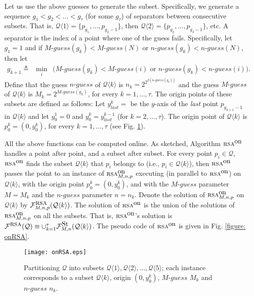 \documentclass[11pt]{article}
\newcommand{\lrangle}[1]{\langle #1\rangle}
\newcommand{\calF}{\mathcal{F}}
\newcommand{\calQ}{\mathcal{Q}}
\newcommand{\onRSAmnp}[0]{\mbox{\sc rsa}^{\mbox{\upshape on}}_{\MM,\nn,p}}
\newcommand{\onRSA}{\mbox{\sc rsa}^{\mbox{\upshape on}}}
\newcommand{\RSAFon}[0]{\calF^{\mbox{\upshape St}}_{\MM,\nn}}
\newcommand{\MM}[0]{M}
\newcommand{\nn}{n}
\newcommand{\nguess}[0]{n\mbox{-}guess}
\newcommand{\Mguess}[0]{M\mbox{-}guess}
\newcommand{\tetration}[1]{2^{2^{2#1}}}
\newcommand{\FRSAmn}[0]{\calF^{\mbox{\sc rsa}}_{\MM,\nn,p}}
\newcommand{\FRSA}[0]{\calF^{\mbox{\sc rsa}}}
\begin{document}
Let us use the above guesses to generate the subset.
Specifically, we generate a sequence $g_1<g_2<...<g_\tau$ (for some $g_\tau$)
of separators between consecutive subsets.
That is, $\calQ\lrangle{1}=\{p_{g_1},...,p_{{g_2}-1}\}$, then $\calQ\lrangle{2}=\{p_{g_2},...,p_{{g_3}-1}\}$, etc.
A separator is the index of a point where one of the guess fails.
Specifically, let $g_1=1$ and if $\Mguess({g_k})<\Mguess(N)$ or $\nguess(g_k)<\nguess(N)$, then let
\vspace{-0.0cm}
\begin{eqnarray}
g_{k+1}\triangleq&\min_i&\big(\Mguess(g_k)<\Mguess(i)
\mbox{ or }
\nguess(g_k)<\nguess(i)\big).
\label{def: g k+1= separator}
\end{eqnarray}
Define that the guess $\nguess$ of $\calQ\lrangle{k}$ is
$\nn_k=\tetration{(\nguess(g_k))}$ and the guess $\Mguess$ of $\calQ\lrangle{k}$ is
$\MM_k=2^{\Mguess({g_k})}$, for every $k=1,...,\tau$.
The origin points of these subsets are defined as follows:
Let
$y_{last}^k=$ be the $y$-axis of the {\em last} point $p_{g_{k+1}-1}$ in $\calQ\lrangle{k}$
and let $y_0^1=0$ and $y_0^k=y_{last}^{k-1}$ (for $k=2,...,\tau$).
The origin point of $\calQ\lrangle{k}$ is $p_0^k=(0,y_0^k)$, for every $k=1,...,\tau$ (see Fig. \ref{fig: onRSA partition to groups}).



All the above functions can be computed online.
As
sketched,
Algorithm $\onRSA$ handles a point after point, and a subset after subset.
For every point $p_i\in\calQ$, $\onRSA$ finds the subset $\calQ\lrangle{k}$ that $p_i$ belongs to (i.e., $p_i\in\calQ\lrangle{k}$), then $\onRSA$
passes the point to an instance of $\onRSAmnp$ executing (in parallel to $\onRSA$) on $\calQ\lrangle{k}$,
with the origin point $p_0^k=(0,y_0^{k})$, and with the $\Mguess$ parameter $\MM=\MM_k$
and the $\nguess$ parameter $n=n_k$.
Denote the solution
of $\onRSAmnp$
on $\calQ\lrangle{k}$ by $\FRSAmn(\calQ\lrangle{k})$.
The solution of $\onRSA$ is the union of the solutions of $\onRSAmnp$ on all the subsets. That is,
$\onRSA$'s solution is $\FRSA(\calQ)\equiv\cup_{k=1}^{\tau}\RSAFon(\calQ\lrangle{k})$.
The pseudo code of $\onRSA$ is given in Fig. \ref{figure: onRSA}.



\def\FigonRSA{
\begin{figure}[ht!]
\begin{center}
\texttt{[image: onRSA.eps]}
\end{center}
\caption{\sf Partitioning $\calQ$ into subsets $\calQ\lrangle{1},\calQ\lrangle{2},...,\calQ\lrangle{5}$;
each instance corresponds to a subset $\calQ\lrangle{k}$, origin $(0,y^k_0)$, $\Mguess$ $\MM_k$ and $\nguess$ $\nn_k$.
\label{fig: onRSA partition to groups}
}
\end{figure}
}\FigonRSA
\end{document}
